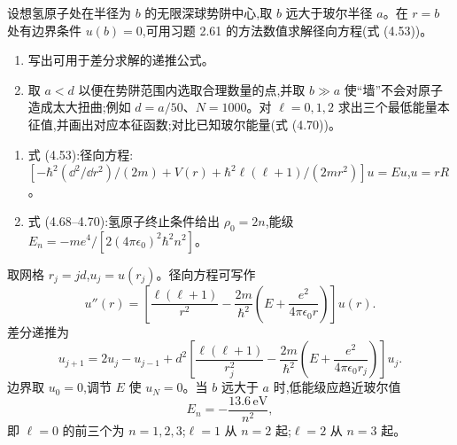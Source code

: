 \begin{question}
设想氢原子处在半径为 $b$ 的无限深球势阱中心,取 $b$ 远大于玻尔半径 $a$。在 $r=b$ 处有边界条件 $u(b)=0$,可用习题 2.61 的方法数值求解径向方程(式 (4.53))。
\begin{enumerate}
\item 写出可用于差分求解的递推公式。
\item 取 $a<d$ 以便在势阱范围内选取合理数量的点,并取 $b\gg a$ 使“墙”不会对原子造成太大扭曲;例如 $d=a/50$、$N=1000$。对 $\ell=0,1,2$ 求出三个最低能量本征值,并画出对应本征函数;对比已知玻尔能量(式 (4.70))。
\end{enumerate}

\par\smallskip
{}
\begin{enumerate}[leftmargin=2.2em,itemsep=0.12em,topsep=0.12em,parsep=0pt]
\item 式 (4.53):径向方程:$[-\hbar^2(\dd^2/\dd r^2)/(2m)+V(r)+\hbar^2\ell(\ell+1)/(2mr^2)]u=Eu$,$u=rR$。
\item 式 (4.68--4.70):氢原子终止条件给出 $\rho_0=2n$,能级 $E_n=-me^4/[2(4\pi\epsilon_0)^2\hbar^2n^2]$。
\end{enumerate}

\end{question}
\begin{solution}

取网格 $r_j=jd$,$u_j=u(r_j)$。径向方程可写作
\[
u''(r)=\left[\frac{\ell(\ell+1)}{r^2}-\frac{2m}{\hbar^2}\left(E+\frac{e^2}{4\pi\epsilon_0r}\right)\right]u(r).
\]
差分递推为
\[
u_{j+1}=2u_j-u_{j-1}+d^2\left[\frac{\ell(\ell+1)}{r_j^2}-\frac{2m}{\hbar^2}\left(E+\frac{e^2}{4\pi\epsilon_0r_j}\right)\right]u_j.
\]
边界取 $u_0=0$,调节 $E$ 使 $u_N=0$。当 $b$ 远大于 $a$ 时,低能级应趋近玻尔值
\[
E_n=-\frac{13.6\,\mathrm{eV}}{n^2},
\]
即 $\ell=0$ 的前三个为 $n=1,2,3$;$\ell=1$ 从 $n=2$ 起;$\ell=2$ 从 $n=3$ 起。

\end{solution}

